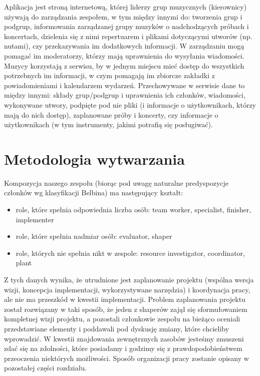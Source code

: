 \documentclass[11pt,a4paper]{article}
\renewcommand{\_}{\char`_}
\begin{document}
Aplikacja jest stroną internetową, której liderzy grup muzycznych (kierownicy) używają do zarządzania zespołem, w tym między innymi do: tworzenia grup i podgrup, informowania zarządzanej grupy muzyków o nadchodzących próbach i koncertach, dzielenia się z nimi repertuarem i plikami dotyczącymi utworów (np. nutami), czy przekazywania im dodatkowych informacji. W zarządzaniu mogą pomagać im moderatorzy, którzy mają uprawnienia do wysyłania wiadomości. Muzycy korzystają z serwisu, by w jednym miejscu mieć dostęp do wszystkich potrzebnych im informacji, w czym pomagają im zbiorcze zakładki z powiadomieniami i kalendarzem wydarzeń. Przechowywane w serwisie dane to między innymi: składy grup/podgrup i uprawnienia ich członków, wiadomości, wykonywane utwory, podpięte pod nie pliki (i informacje o użytkownikach, którzy mają do nich dostęp), zaplanowane próby i koncerty, czy informacje o użytkownikach (w tym instrumenty, jakimi potrafią się posługiwać).

\section{Metodologia wytwarzania}

Kompozycja naszego zespołu (biorąc pod uwagę naturalne predyspozycje członków wg klasyfikacji Belbina) ma następujący kształt:
\begin{itemize}
    \item role, które spełnia odpowiednia liczba osób: team worker, specialist, finisher, implementer
    \item role, które spełnia nadmiar osób: evaluator, shaper
    \item role, których nie spełnia nikt w zespole: resource investigator, coordinator, plant
\end{itemize}
Z tych danych wynika, że utrudnione jest zaplanowanie projektu (wspólna wersja wizji, koncepcja implementacji, wykorzystywane narzędzia) i koordynacja pracy, ale nie ma przeszkód w kwestii implementacji. Problem zaplanowania projektu został rozwiązany w taki sposób, że jeden z shaperów zajął się sformułowaniem kompletnej wizji projektu, a pozostali członkowie zespołu na bieżąco oceniali przedstawiane elementy i poddawali pod dyskusję zmiany, które chcieliby wprowadzić. W kwestii znajdowania zewnętrznych zasobów jesteśmy zmuszeni zdać się na zdolności, które posiadamy i godzimy się z prawdopodobieństwem przeoczenia niektórych możliwości. Sposób organizacji pracy zostanie opisany w pozostałej części rozdziału.
\end{document}
